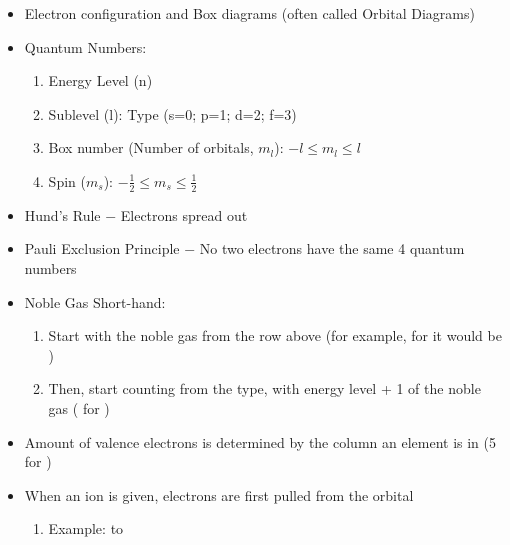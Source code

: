 \documentclass[12pt]{article}
\begin{document}
\begin{itemize}
  \item Electron configuration and Box diagrams (often called Orbital Diagrams)

    \newpage

  \item Quantum Numbers:

    \begin{enumerate}

      \item Energy Level (n)

      \item Sublevel (l): Type (s=0; p=1; d=2; f=3)

      \item Box number (Number of orbitals, $m_l$): $-l\leq m_l\leq l$

      \item Spin ($m_s$): $-\frac{1}{2}\leq m_s\leq \frac{1}{2}$

    \end{enumerate}

  \item Hund's Rule $-$ Electrons spread out

  \item Pauli Exclusion Principle $-$ No two electrons have the same 4 quantum numbers

  \item Noble Gas Short-hand:

    \begin{enumerate}

      \item Start with the noble gas from the row above (for example, for  it would be )

      \item Then, start counting from the  type, with energy level + 1 of the noble gas ( for ) 

    \end{enumerate}

  \item Amount of valence electrons is determined by the column an element is in (5 for )

  \item When an ion is given, electrons are first pulled from the  orbital

    \begin{enumerate}

      \item Example:  to 


\end{enumerate}
\end{itemize}
\end{document}
